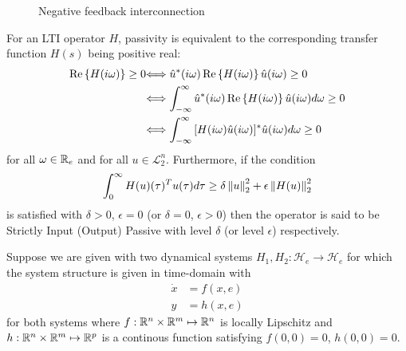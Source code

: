 \begin{figure}%
\centering
{}
\caption{Negative feedback interconnection}%
\label{fig:apdx:passint}%
\end{figure}

\begin{define}For an LTI operator $H$, passivity is equivalent to the corresponding transfer function $H(s)$ being positive real:
\begin{align*}
{\operatorname{Re}\left\{ H(i\omega) \right\}\geq 0} &{\Longleftrightarrow
\hat{u}^*(i\omega) \operatorname{Re}\left\{ H(i\omega) \right\}\hat{u}(i\omega) \geq 0}\\
&{\Longleftrightarrow \int_{-\infty}^\infty{\hat{u}^*(i\omega)\operatorname{Re}\left\{ H(i\omega) \right\} \hat{u}(i\omega)d\omega} \geq 0}\\
&{\Longleftrightarrow \int_{-\infty}^\infty{{[H(i\omega)\hat{u}(i\omega)]^*}\hat{u}(i\omega)d\omega} \geq 0}
\end{align*}
for all $\omega\in\mathbb{R}_e$ and for all $u\in\mathcal{L}_{2}^n$. Furthermore, if the condition
\[
\int_0^\infty{H(u)(\tau)^Tu(\tau)d\tau} \geq \delta\displaystyle \left\| u \right\|_2^2 + \epsilon\displaystyle \left\| H(u) \right\|_2^2
\]
is satisfied with $\delta > 0$, $\epsilon = 0$ (or $\delta = 0$, $\epsilon > 0$) then the operator is said to be Strictly Input 
(Output) Passive with level $\delta$ (or level $\epsilon$) respectively. 
\end{define}



Suppose we are given with two dynamical systems $H_1,H_2: \mathcal{H}_e\to\mathcal{H}_e$ for which the system structure is given 
in time-domain with 
\begin{align}
\dot{x} &= f(x,e)\\
y &= h(x,e)
\end{align}
for both systems where $f: \mathbb{R}^n\times\mathbb{R}^m\mapsto \mathbb{R}^n$ is locally Lipschitz and $h: \mathbb{R}^n\times\mathbb{R}^m\mapsto \mathbb{R}^p$
is a continous function satisfying $f(0,0)=0$, $h(0,0)=0$. 

